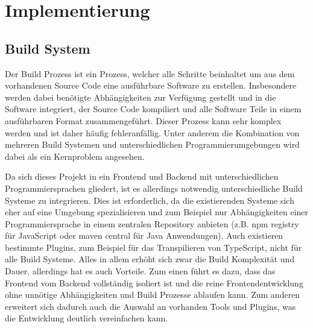 \chapter{Implementierung}

\section{Build System}
Der Build Prozess ist ein Prozess, welcher alle Schritte beinhaltet um aus dem vorhandenen Source Code eine ausführbare Software zu erstellen. Insbesondere werden dabei benötigte Abhängigkeiten zur Verfügung gestellt und in die Software integriert, der Source Code kompiliert und alle Software Teile in einem ausführbaren Format zusammengeführt. Dieser Prozess kann sehr komplex werden und ist daher häufig fehleranfällig. Unter anderem die Kombination von mehreren Build Systemen und unterschiedlichen Programmierumgebungen wird dabei als ein Kernproblem angesehen. %

Da sich dieses Projekt in ein Frontend und Backend mit unterschiedlichen Programmiersprachen gliedert, ist es allerdings notwendig unterschiedliche Build Systeme zu integrieren. Dies ist erforderlich, da die existierenden Systeme sich eher auf eine Umgebung spezialisieren und zum Beispiel nur Abhängigkeiten einer Programmiersprache in einem zentralen Repository anbieten (z.B. npm registry für JavaScript oder maven central für Java Anwendungen). Auch existieren bestimmte Plugins, zum Beispiel für das Transpilieren von TypeScript, nicht für alle Build Systeme. Alles in allem erhöht sich zwar die Build Komplexität und Dauer, allerdings hat es auch Vorteile. Zum einen führt es dazu, dass das Frontend vom Backend vollständig isoliert ist und die reine Frontendentwicklung ohne unnötige Abhängigkeiten und Build Prozesse ablaufen kann. Zum anderen erweitert sich dadurch auch die Auswahl an vorhanden Tools und Plugins, was die Entwicklung deutlich vereinfachen kann.

